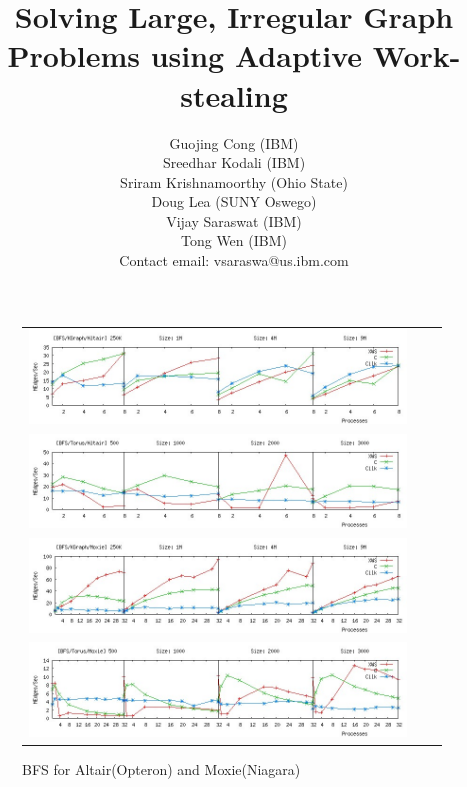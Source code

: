\documentclass[10pt]{ieee}
\numberwithin{equation}{section}
\begin{document}
\title{Solving Large, Irregular Graph Problems using Adaptive Work-stealing}

\author{
Guojing Cong (IBM)\\ 
Sreedhar Kodali (IBM)\\
Sriram Krishnamoorthy (Ohio State) \\
Doug Lea (SUNY Oswego)\\
Vijay Saraswat (IBM)\\
Tong Wen (IBM)\\
Contact email: vsaraswa@us.ibm.com\\ 
}

\date{}

\maketitle
\thispagestyle{empty}




%

%



%
%
%
{\footnotesize


}
\onecolumn
\begin{figure}
 \begin{tabular}{ccc}
 \includegraphics[width=10cm]{bfs-kgraph-altair-color.jpg} \\
 \includegraphics[width=10cm] {bfs-torus-altair-color.jpg} \\
\includegraphics[width=10cm]{bfs-kgraph-moxie-color.jpg} \\
\includegraphics[width=10cm]{bfs-torus-moxie-color.jpg}
 \end{tabular}
\caption{BFS for Altair(Opteron) and Moxie(Niagara)}\label{DFS-altair}\label{BFS-altair}
\end{figure}
\twocolumn
\end{document}
